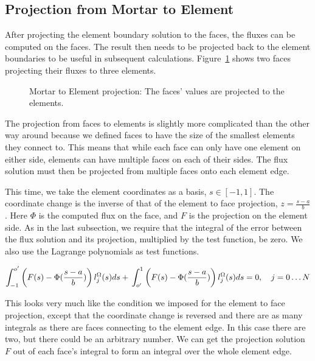 \subsection{Projection from Mortar to Element}\label{subsection:adaptive_mesh_refinement:mortar_element_method:mortar_to_element}

After projecting the element boundary solution to the faces, the fluxes can be computed on the
faces. The result then needs to be projected back to the element boundaries to be useful in
subsequent calculations. Figure~\ref{fig:mortar_to_element} shows two faces projecting their fluxes
to three elements.

\begin{figure}[H]
    \centering
    
    \caption{Mortar to Element projection: The faces' values are projected to the elements.}\label{fig:mortar_to_element}
\end{figure}

The projection from faces to elements is slightly more complicated than the
other way around because we defined faces to have the size of the smallest elements they connect to.
This means that while each face can only have one element on either side, elements can have multiple
faces on each of their sides. The flux solution must then be projected from multiple faces onto each
element edge.

This time, we take the element coordinates as a basis, \(s \in [-1, 1]\). The coordinate change is
the inverse of that of the element to face projection, \(z = \frac{s - a}{b}\). Here \(\Phi \) is
the computed flux on the face, and \(F\) is the projection on the element side. As in the last
subsection, we require that the integral of the error between the flux solution and its projection,
multiplied by the test function, be zero. We also use the Lagrange polynomials as test functions.

\begin{equation} \label{equ:zero_error_to_element}
    \int_{-1}^{o'} \left( F(s) - \Phi (\frac{s - a}{b}) \right) l_j^\Omega(s)ds + \\
    \int_{o'}^{1} \left( F(s) - \Phi (\frac{s - a}{b}) \right) l_j^\Omega (s)ds = 0, \\
    \quad j = 0 \ldots N
\end{equation}

\noindent
This looks very much like the condition we imposed for the element to face projection, except that
the coordinate change is reversed and there are as many integrals as there are faces connecting to
the element edge. In this case there are two, but there could be an arbitrary number. We can get the
projection solution \(F\) out of each face's integral to form an integral over the whole element
edge.

